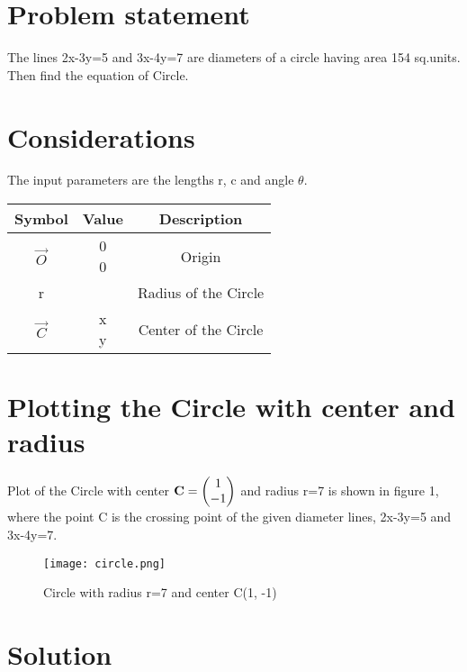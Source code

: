 \documentclass[journal,10pt,twocolumn]{article}
\begin{document}
\section{Problem statement}
The lines 2x-3y=5 and 3x-4y=7 are diameters of a circle having area 154 sq.units. Then find the equation of Circle.
\section{Considerations}
\vspace{0.2cm}
The input parameters are the lengths r, c and angle $\theta$. \\
\vspace{0.2cm}
{
\setlength\extrarowheight{2pt}
\begin{tabular}{|c|c|c|}
	\hline
	\textbf{Symbol}&\textbf{Value}&\textbf{Description}\\
	\hline
	$\vec{O}$ & \myvec{0\\0}
	&Origin\\
	\hline
	r&  & Radius of the Circle\\
	\hline
	$\vec{C}$ & \myvec{x \\ y}
	&Center of the Circle
	\\
\hline
\end{tabular}
}
\section{Plotting the Circle with center and radius}
\vspace{0.25cm}
Plot of the Circle with center $\mathbf{C} =\begin{pmatrix}1\\-1\end{pmatrix}$ and radius r=7  is shown in figure 1, where the point C is the crossing point of the given diameter lines, 2x-3y=5 and 3x-4y=7.
\begin{figure}[h]
\texttt{[image: circle.png]}
\caption{Circle with radius r=7 and center C(1, -1)}
\label{fig:Circle with radius and center}
\end{figure}
\section{Solution}
\vspace{0.25cm}
\end{document}
